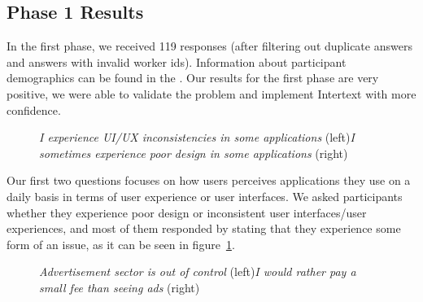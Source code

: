 \subsection{Phase 1 Results}

In the first phase, we received 119 responses (after filtering out duplicate answers and answers with invalid worker ids). Information about participant demographics can be found in the . Our results for the first phase are very positive, we were able to validate the problem and implement Intertext with more confidence.


\begin{figure}[H]
\centering
{}
\vspace*{-5mm}
\caption{\newline\textit{I experience UI/UX inconsistencies in some applications} (left)\newline\textit{I sometimes experience poor design in some applications} (right)} \label{fig:ev_p1_1}
\end{figure}

Our first two questions focuses on how users perceives applications they use on a daily basis in terms of user experience or user interfaces. We asked participants whether they experience poor design or inconsistent user interfaces/user experiences, and most of them responded by stating that they experience some form of an issue, as it can be seen in figure~\ref{fig:ev_p1_1}.


\begin{figure}[H]
\centering
{}
\vspace*{-5mm}
\caption{\newline\textit{Advertisement sector is out of control} (left)\newline\textit{I would rather pay a small fee than seeing ads} (right)} \label{fig:ev_p1_2}
\end{figure}

